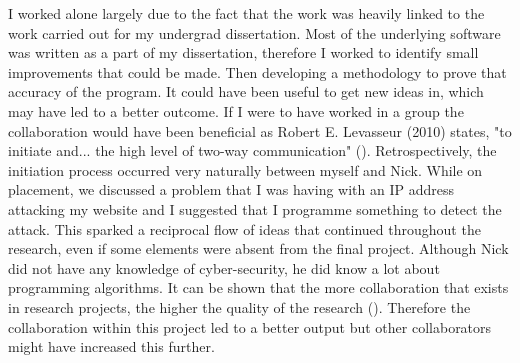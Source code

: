 I worked alone largely due to the fact that the work was heavily linked to the work carried out for my undergrad dissertation. Most of the underlying software was written as a part of my dissertation, therefore I worked to identify small improvements that could be made. Then developing a methodology to prove that accuracy of the program. It could have been useful to get new ideas in, which may have led to a better outcome. If I were to have worked in a group the collaboration would have been beneficial as Robert E. Levasseur (2010) states, "to initiate and... the high level of two-way communication" (\cite{levasseur2010people}). Retrospectively, the initiation process occurred very naturally between myself and Nick. While on placement, we discussed a problem that I was having with an IP address attacking my website and I suggested that I programme something to detect the attack. This sparked a reciprocal flow of ideas that continued throughout the research, even if some elements were absent from the final project. Although Nick did not have any knowledge of cyber-security, he did know a lot about programming algorithms. It can be shown that the more collaboration that exists in research projects, the higher the quality of the research (\cite{figg2006scientific}). Therefore the collaboration within this project led to a better output but other collaborators might have increased this further. 




